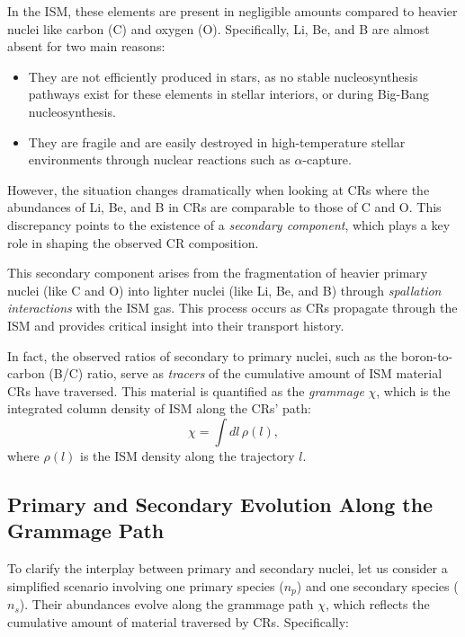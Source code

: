 In the ISM, these elements are present in negligible amounts compared to heavier nuclei like carbon (C) and oxygen (O). Specifically, Li, Be, and B are almost absent for two main reasons:  
\begin{itemize}
\item They are not efficiently produced in stars, as no stable nucleosynthesis pathways exist for these elements in stellar interiors, or during Big-Bang nucleosynthesis.  
\item They are fragile and are easily destroyed in high-temperature stellar environments through nuclear reactions such as \(\alpha\)-capture.  
\end{itemize}

However, the situation changes dramatically when looking at CRs where the abundances of Li, Be, and B in CRs are comparable to those of C and O. This discrepancy points to the existence of a \emph{secondary component}, which plays a key role in shaping the observed CR composition.  

This secondary component arises from the fragmentation of heavier primary nuclei (like C and O) into lighter nuclei (like Li, Be, and B) through \emph{spallation interactions} with the ISM gas. This process occurs as CRs propagate through the ISM and provides critical insight into their transport history.  

In fact, the observed ratios of secondary to primary nuclei, such as the boron-to-carbon (B/C) ratio, serve as \emph{tracers} of the cumulative amount of ISM material CRs have traversed. This material is quantified as the \emph{grammage} \(\chi\), which is the integrated column density of ISM along the CRs’ path:  
\begin{equation}
\chi = \int \! dl \, \rho(l),
\end{equation}
where \(\rho(l)\) is the ISM density along the trajectory \(l\).  

\subsection{Primary and Secondary Evolution Along the Grammage Path}

To clarify the interplay between primary and secondary nuclei, let us consider a simplified scenario involving one primary species (\(n_p\)) and one secondary species (\(n_s\)). Their abundances evolve along the grammage path \(\chi\), which reflects the cumulative amount of material traversed by CRs. Specifically:  

